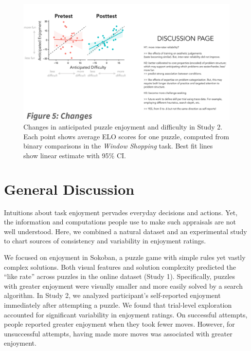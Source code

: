\documentclass[10pt,letterpaper]{article}
\begin{document}
\begin{figure}[hbt]
\includegraphics[width=0.9\linewidth]{figures/fig6.pdf}
        
\caption{Changes in anticipated puzzle enjoyment and difficulty in Study 2. Each point shows average ELO scores for one puzzle, computed from binary comparisons in the \textit{Window Shopping} task. Best fit lines show linear estimate with 95\% CI.}
\label{exp2_interaction}
\end{figure}

\section{General Discussion}

Intuitions about task enjoyment pervades everyday decisions and actions. Yet, the information and computations people use to make such appraisals are not well understood. Here, we combined a natural dataset and an experimental study to chart sources of consistency and variability in enjoyment ratings. 

We focused on enjoyment in Sokoban, a puzzle game with simple rules yet vastly complex solutions. Both visual features and solution complexity predicted the ``like rate'' across puzzles in the online dataset (Study 1). Specifically, puzzles with greater enjoyment were visually smaller and more easily solved by a search algorithm. %
In Study 2, we analyzed participant's self-reported enjoyment immediately after attempting a puzzle. We found that trial-level exploration accounted for significant variability in enjoyment ratings. On successful attempts, people reported greater enjoyment when they took fewer moves. However, for unsuccessful attempts, having made more moves was associated with greater enjoyment.
\end{document}
